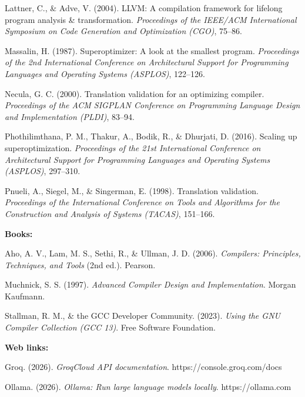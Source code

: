\documentclass[12pt,a4paper]{report}
\newcommand{\apa}[1]{\par\hangindent=1.27cm\hangafter=1 #1\par}
\newcommand{\refgroup}[1]{\par\vspace{0.35cm}\noindent\textbf{#1}\par\vspace{0.1cm}}
\begin{document}
\apa{Lattner, C., \& Adve, V. (2004). LLVM: A compilation framework for lifelong program analysis \& transformation. \textit{Proceedings of the IEEE/ACM International Symposium on Code Generation and Optimization (CGO)}, 75--86.}

\apa{Massalin, H. (1987). Superoptimizer: A look at the smallest program. \textit{Proceedings of the 2nd International Conference on Architectural Support for Programming Languages and Operating Systems (ASPLOS)}, 122--126.}

\apa{Necula, G. C. (2000). Translation validation for an optimizing compiler. \textit{Proceedings of the ACM SIGPLAN Conference on Programming Language Design and Implementation (PLDI)}, 83--94.}

\apa{Phothilimthana, P. M., Thakur, A., Bodik, R., \& Dhurjati, D. (2016). Scaling up superoptimization. \textit{Proceedings of the 21st International Conference on Architectural Support for Programming Languages and Operating Systems (ASPLOS)}, 297--310.}

\apa{Pnueli, A., Siegel, M., \& Singerman, E. (1998). Translation validation. \textit{Proceedings of the International Conference on Tools and Algorithms for the Construction and Analysis of Systems (TACAS)}, 151--166.}

\refgroup{Books:}

\apa{Aho, A. V., Lam, M. S., Sethi, R., \& Ullman, J. D. (2006). \textit{Compilers: Principles, Techniques, and Tools} (2nd ed.). Pearson.}

\apa{Muchnick, S. S. (1997). \textit{Advanced Compiler Design and Implementation}. Morgan Kaufmann.}

\apa{Stallman, R. M., \& the GCC Developer Community. (2023). \textit{Using the GNU Compiler Collection (GCC 13)}. Free Software Foundation.}

\refgroup{Web links:}

\apa{Groq. (2026). \textit{GroqCloud API documentation}. https://console.groq.com/docs}

\apa{Ollama. (2026). \textit{Ollama: Run large language models locally}. https://ollama.com}
\end{document}
